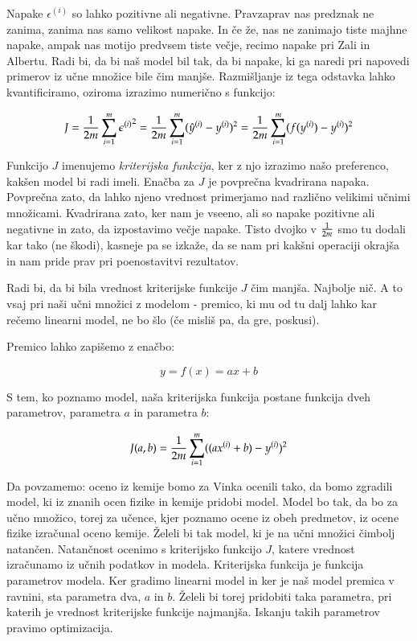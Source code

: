 Napake $\epsilon^{(i)}$ so lahko pozitivne ali negativne.
Pravzaprav nas predznak ne zanima, zanima nas samo velikost napake. In
če že, nas ne zanimajo tiste majhne napake, ampak nas motijo predvsem
tiste večje, recimo napake pri Zali in Albertu. Radi bi, da bi naš
model bil tak, da bi napake, ki ga naredi pri napovedi primerov iz
učne množice bile čim manjše. Razmišljanje iz tega odstavka lahko
kvantificiramo, oziroma izrazimo numerično s funkcijo:

\begin{equation}
J = {1\over 2m}\sum_{i=1}^m {\epsilon^{(i)}}^2 = {1\over 2m}\sum_{i=1}^m
(\hat{y}^{(i)}-y^{(i)})^2 = {1\over 2m}\sum_{i=1}^m (f(y^{(i)})-y^{(i)})^2
\label{eq:jab}
\end{equation}

Funkcijo $J$ imenujemo {\em kriterijska funkcija}, ker z njo izrazimo
našo preferenco, kakšen model bi radi imeli. Enačba za $J$ je
povprečna kvadrirana napaka. Povprečna zato, da lahko njeno vrednost
primerjamo nad različno velikimi učnimi množicami. Kvadrirana zato,
ker nam je vseeno, ali so napake pozitivne ali negativne in zato, da
izpostavimo večje napake. Tisto dvojko v $1\over 2m$ smo tu dodali kar
tako (ne škodi), kasneje pa se izkaže, da se nam pri kakšni operaciji
okrajša in nam pride prav pri poenostavitvi rezultatov.

Radi bi, da bi bila vrednost kriterijske funkcije $J$ čim
manjša. Najbolje nič. A to vsaj pri naši učni množici z modelom -
premico, ki mu od tu dalj lahko kar rečemo linearni model, ne bo šlo
(če misliš pa, da gre, poskusi).

Premico lahko zapišemo z enačbo:

\begin{equation}
  y=f(x)=a x + b
\end{equation}

S tem, ko poznamo model, naša kriterijska funkcija postane funkcija
dveh parametrov, parametra $a$ in parametra $b$:

\begin{equation}
  J(a, b) = {1\over 2m}\sum_{i=1}^m ((a x^{(i)} + b)-y^{(i)})^2
\end{equation}

Da povzamemo: oceno iz kemije bomo za Vinka ocenili tako, da bomo
zgradili model, ki iz znanih ocen fizike in kemije pridobi
model. Model bo tak, da bo za učno množico, torej za učence, kjer
poznamo ocene iz obeh predmetov, iz ocene fizike izračunal oceno
kemije. Želeli bi tak model, ki je na učni množici čimbolj
natančen. Natančnost ocenimo s kriterijsko funkcijo $J$, katere
vrednost izračunamo iz učnih podatkov in modela. Kriterijska funkcija
je funkcija parametrov modela. Ker gradimo linearni model in ker je
naš model premica v ravnini, sta parametra dva, $a$ in $b$. Želeli bi
torej pridobiti taka parametra, pri katerih je vrednost kriterijske
funkcije najmanjša. Iskanju takih parametrov pravimo optimizacija.

